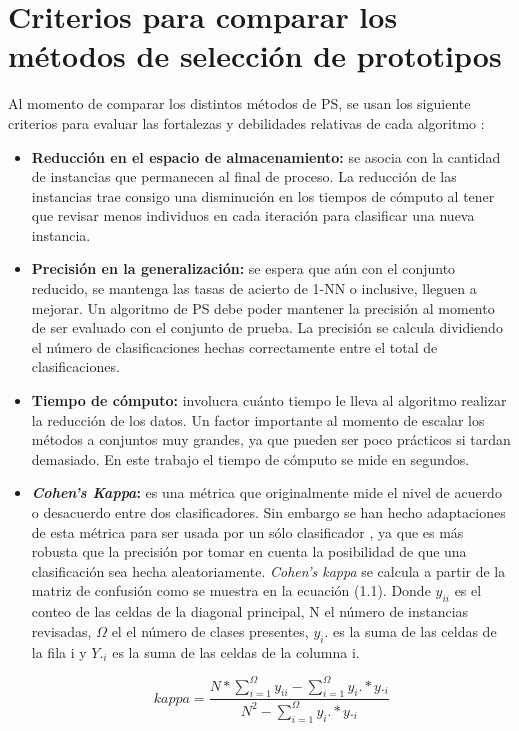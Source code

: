 \section{Criterios para comparar los métodos de selección de prototipos}

Al momento de comparar los distintos métodos de PS, se usan los siguiente criterios para evaluar las fortalezas y debilidades relativas de cada algoritmo \cite{garcia2016data}:

\begin{itemize}
\item \textbf{Reducción en el espacio de almacenamiento: }
se asocia con la cantidad de instancias que permanecen al final de proceso. La reducción de las instancias trae consigo una disminución en los tiempos de cómputo al tener que revisar menos individuos en cada iteración para clasificar una nueva instancia.

\item \textbf{Precisión en la generalización: }
se espera que aún con el conjunto reducido, se mantenga las tasas de acierto de 1-NN o inclusive, lleguen a mejorar. Un algoritmo de PS debe poder mantener la precisión al momento de ser evaluado con el conjunto de prueba. La precisión se calcula dividiendo el número de clasificaciones hechas correctamente entre el total de clasificaciones.

\item \textbf{Tiempo de cómputo: }
involucra cuánto tiempo le lleva al algoritmo realizar la reducción de los datos. Un factor importante al momento de escalar los métodos a conjuntos muy grandes, ya que pueden ser poco prácticos si tardan demasiado. En este trabajo el tiempo de cómputo se mide en segundos.

\item \textbf{\emph{Cohen's Kappa}: } 
es una métrica que originalmente mide el nivel de acuerdo o desacuerdo entre dos clasificadores. Sin embargo se han hecho adaptaciones de esta métrica para ser usada por un sólo clasificador \cite{garcia2012prototype}, ya que es más robusta que la precisión por tomar en cuenta la posibilidad de que una clasificación sea hecha aleatoriamente. \emph{Cohen's kappa} se calcula a partir de la matriz de confusión como se muestra en la ecuación (1.1). Donde $y_{ii}$ es el conteo de las celdas de la diagonal principal, N el número de instancias revisadas, $\Omega$ el el número de clases presentes, $y_i.$ es la suma de las celdas de la fila i y $Y._i$ es la suma de las celdas de la columna i.

\begin{equation} 
kappa = \frac{N*\sum_{i=1}^{\Omega}y_{ii} - \sum_{i=1}^{\Omega}y_i.*y._i}{N^2 - \sum_{i=1}^{\Omega}y_i.*y._i}
\end{equation}

\end{itemize}